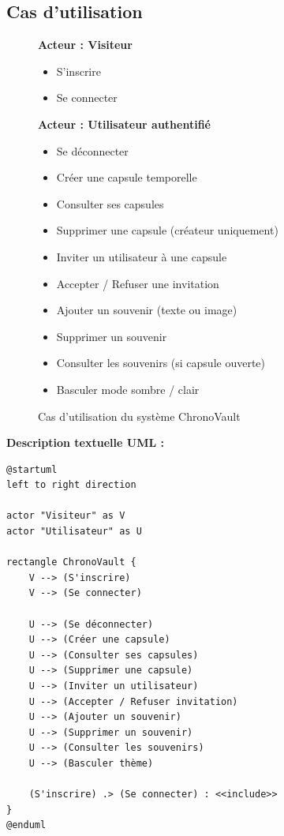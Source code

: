 \documentclass[12pt,a4paper]{report}
\begin{document}
\subsection{Cas d'utilisation}

\begin{figure}[H]
    \centering
    \begin{tcolorbox}[colback=codebg, colframe=codeframe, width=\textwidth, title={\textbf{Diagramme de cas d'utilisation — ChronoVault}}]
        \small
        \textbf{Acteur : Visiteur}
        \begin{itemize}[noitemsep, leftmargin=1.5em]
            \item S'inscrire
            \item Se connecter
        \end{itemize}

        \vspace{0.3cm}
        \textbf{Acteur : Utilisateur authentifié}
        \begin{itemize}[noitemsep, leftmargin=1.5em]
            \item Se déconnecter
            \item Créer une capsule temporelle
            \item Consulter ses capsules
            \item Supprimer une capsule (créateur uniquement)
            \item Inviter un utilisateur à une capsule
            \item Accepter / Refuser une invitation
            \item Ajouter un souvenir (texte ou image)
            \item Supprimer un souvenir
            \item Consulter les souvenirs (si capsule ouverte)
            \item Basculer mode sombre / clair
        \end{itemize}
    \end{tcolorbox}
    \caption{Cas d'utilisation du système ChronoVault}
\end{figure}

\noindent
\textbf{Description textuelle UML :}

\begin{verbatim}
@startuml
left to right direction

actor "Visiteur" as V
actor "Utilisateur" as U

rectangle ChronoVault {
    V --> (S'inscrire)
    V --> (Se connecter)

    U --> (Se déconnecter)
    U --> (Créer une capsule)
    U --> (Consulter ses capsules)
    U --> (Supprimer une capsule)
    U --> (Inviter un utilisateur)
    U --> (Accepter / Refuser invitation)
    U --> (Ajouter un souvenir)
    U --> (Supprimer un souvenir)
    U --> (Consulter les souvenirs)
    U --> (Basculer thème)

    (S'inscrire) .> (Se connecter) : <<include>>
}
@enduml
\end{verbatim}
\end{document}
